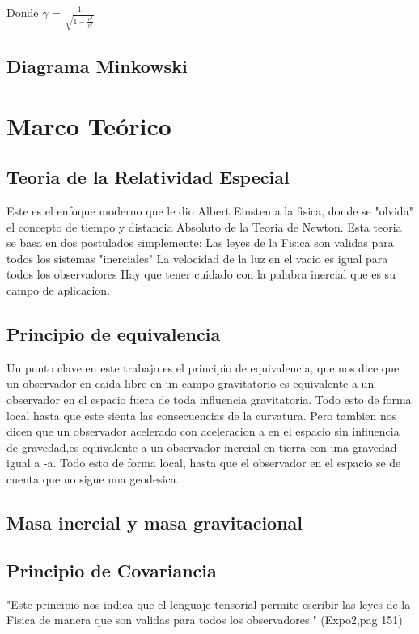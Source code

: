 \documentclass[12pt,twoside]{rif}
\begin{document}
Donde $\gamma$ = $\frac{1}{\sqrt{1-\frac{v^{2}}{c^{2}}}}$
	
	
	\subsection{Diagrama Minkowski}
	
	
	
	\section{Marco Teórico}
	\subsection{Teoria de la Relatividad Especial}
	Este es el enfoque moderno que le dio Albert Einsten a la fisica, donde se "olvida" el concepto de tiempo y distancia Absoluto de la Teoria de Newton.
	Esta teoria se basa en dos postulados simplemente:
	Las leyes de la Fisica son validas para todos los sistemas "inerciales"
	 La velocidad de la luz en el vacio es igual para todos los observadores 
	Hay que tener cuidado con la palabra inercial que es su campo de aplicacion.
	\subsection{Principio de equivalencia}
	Un punto clave en este trabajo es el principio de equivalencia, que nos dice que un observador en caida libre en un campo gravitatorio es equivalente a un observador en el espacio fuera de toda influencia gravitatoria. Todo esto de forma local hasta que este sienta las consecuencias de la curvatura. Pero tambien nos dicen que un observador acelerado con aceleracion a en el espacio sin influencia de gravedad,es equivalente a un observador inercial en tierra con una gravedad igual a -a. Todo esto de forma local, hasta que el observador en el espacio se de cuenta que no sigue una geodesica.
	\subsection{Masa inercial y masa gravitacional}
	
	\subsection{Principio de Covariancia}
	"Este principio nos indica que el lenguaje tensorial permite escribir las leyes de la Fisica de manera que son validas para todos los observadores." (Expo2,pag 151)
\end{document}
